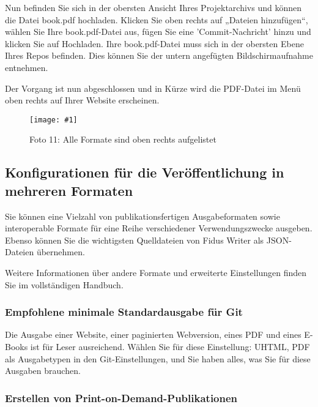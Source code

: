 \documentclass{article}
\newlength{\imgwidth}
\newcommand\scaledgraphics[2]{%
                
\settowidth{\imgwidth}{\texttt{[image: \#1]}}%
                
\setlength{\imgwidth}{\minof{\imgwidth}{#2\textwidth}}%
                
\texttt{[image: \#1]}%
                
}
\begin{document}
Nun befinden Sie sich in der obersten Ansicht Ihres Projektarchivs und können die Datei book.pdf hochladen. Klicken Sie oben rechts auf „Dateien hinzufügen“, wählen Sie Ihre book.pdf-Datei aus, fügen Sie eine 'Commit-Nachricht' hinzu und klicken Sie auf Hochladen. Ihre book.pdf-Datei muss sich in der obersten Ebene Ihres Repos befinden. Dies können Sie der untern angefügten Bildschirmaufnahme entnehmen.


Der Vorgang ist nun abgeschlossen und in Kürze wird die PDF-Datei im Menü oben rechts auf Ihrer Website erscheinen.

\begin{figure}
\scaledgraphics{0aea86b5-871e-4b80-95ca-5b030854029d.png}{1}
\caption*{Foto 11: Alle Formate sind oben rechts aufgelistet}\label{F3799511}
\end{figure}


\subsection{Konfigurationen für die Veröffentlichung in mehreren Formaten}\label{H2975996}



Sie können eine Vielzahl von publikationsfertigen Ausgabeformaten sowie interoperable Formate für eine Reihe verschiedener Verwendungszwecke ausgeben. Ebenso können Sie die wichtigsten Quelldateien von Fidus Writer als JSON-Dateien übernehmen.


Weitere Informationen über andere Formate und erweiterte Einstellungen finden Sie im vollständigen Handbuch.


\subsubsection{Empfohlene minimale Standardausgabe für Git}\label{H1730107}



Die Ausgabe einer Website, einer paginierten Webversion, eines PDF und eines E-Books ist für Leser ausreichend. Wählen Sie für diese Einstellung: UHTML, PDF als Ausgabetypen in den Git-Einstellungen, und Sie haben alles, was Sie für diese Ausgaben brauchen.


\subsubsection{Erstellen von Print-on-Demand-Publikationen}\label{H9499495}
\end{document}
